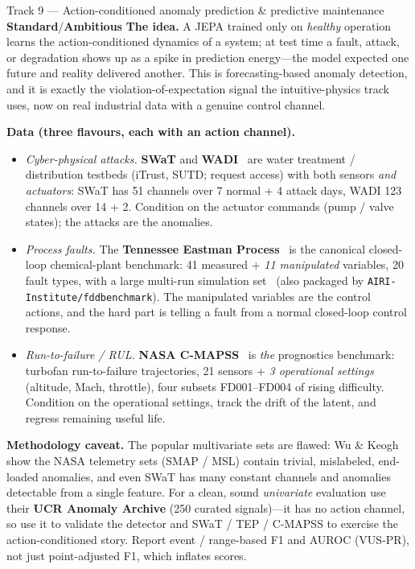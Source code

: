 \documentclass{article}
\newcommand{\code}[1]{\texttt{\small #1}}
\newcommand{\diffmed}{\colorbox{ebamber!18}{\textcolor{ebamber}{\small\bfseries Standard}}}
\newcommand{\diffhard}{\colorbox{ebred!15}{\textcolor{ebred}{\small\bfseries Ambitious}}}
\begin{document}
\begin{trackbox}{Track 9 --- Action-conditioned anomaly prediction \& predictive maintenance \hfill \diffmed{}/\diffhard{}}
\textbf{The idea.} A JEPA trained only on \emph{healthy} operation learns the
action-conditioned dynamics of a system; at test time a fault, attack, or
degradation shows up as a spike in prediction energy---the model expected one
future and reality delivered another. This is forecasting-based anomaly detection,
and it is exactly the violation-of-expectation signal the intuitive-physics track
uses, now on real industrial data with a genuine control channel.

\smallskip
\textbf{Data (three flavours, each with an action channel).}
\begin{itemize}[leftmargin=1.4em,itemsep=2pt,topsep=2pt]
  \item \emph{Cyber-physical attacks.} \textbf{SWaT} and \textbf{WADI}~\citep{SWaT,WADI}
    are water treatment / distribution testbeds (iTrust, SUTD; request access) with
    both sensors \emph{and actuators}: SWaT has 51 channels over 7 normal + 4 attack
    days, WADI 123 channels over 14 + 2. Condition on the actuator commands (pump /
    valve states); the attacks are the anomalies.
  \item \emph{Process faults.} The \textbf{Tennessee Eastman Process}~\citep{TEP} is
    the canonical closed-loop chemical-plant benchmark: 41 measured + \emph{11
    manipulated} variables, 20 fault types, with a large multi-run simulation
    set~\citep{riethTEP} (also packaged by \code{AIRI-Institute/fddbenchmark}). The
    manipulated variables are the control actions, and the hard part is telling a
    fault from a normal closed-loop control response.
  \item \emph{Run-to-failure / RUL.} \textbf{NASA C-MAPSS}~\citep{CMAPSS} is
    \emph{the} prognostics benchmark: turbofan run-to-failure trajectories, 21
    sensors + \emph{3 operational settings} (altitude, Mach, throttle), four subsets
    FD001--FD004 of rising difficulty. Condition on the operational settings, track
    the drift of the latent, and regress remaining useful life.
\end{itemize}

\smallskip
\textbf{Methodology caveat.} The popular multivariate sets are flawed: Wu \&
Keogh~\citep{UCRanomaly} show the NASA telemetry sets (SMAP / MSL) contain trivial,
mislabeled, end-loaded anomalies, and even SWaT has many constant channels and
anomalies detectable from a single feature. For a clean, sound \emph{univariate}
evaluation use their \textbf{UCR Anomaly Archive} (250 curated signals)---it has no
action channel, so use it to validate the detector and SWaT / TEP / C-MAPSS to
exercise the action-conditioned story. Report event / range-based F1 and AUROC
(VUS-PR), not just point-adjusted F1, which inflates scores.


\end{trackbox}
\end{document}
